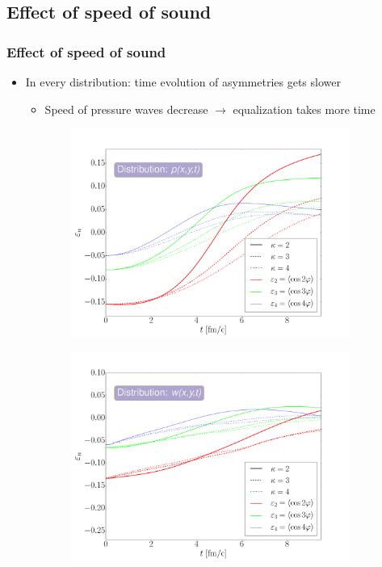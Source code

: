\documentclass{beamer}
\begin{document}
\subsection{Effect of speed of sound}
\begin{frame}
\frametitle{Effect of speed of sound}
\begin{center}
\begin{itemize}
\setlength{\itemsep}{12pt}
\item<1-> In every distribution: time evolution of asymmetries gets slower
\vspace{8pt}
\begin{itemize}
\item<1-> Speed of pressure waves decrease $\rightarrow$ equalization takes more time
\end{itemize}
\end{itemize}
\begin{figure}[H]
	\centering
    \begin{subfigure}[b]{0.49\textwidth}
    		\includegraphics[width=\textwidth]{pic/res/rel/eps_kappa_p.pdf}
	\end{subfigure}
	\begin{subfigure}[b]{0.49\textwidth}
        	\includegraphics[width=\textwidth]{pic/res/rel/eps_kappa_v.pdf}

\end{subfigure}
\end{figure}
\end{center}
\end{frame}
\end{document}
